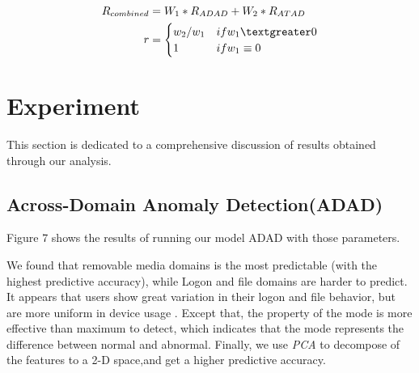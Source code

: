 \documentclass[conference]{IEEEtran}
\begin{document}
\begin{align}
R_{combined}&= W_1*R_{ADAD}+W_2*R_{ATAD}\\
r&=\begin{cases}
w_2/w_1
&\mbox{if } w_1 \textgreater 0\\
1
&\mbox{if } w_1 \equiv 0\\
\end{cases}
\end{align}


\section{Experiment}

This section is dedicated to a comprehensive discussion of results obtained through our analysis.

\subsection{Across-Domain Anomaly Detection(ADAD)}\label{AA}

Figure 7 shows the results of running our model ADAD with those parameters.

We found that removable media domains is the most predictable (with the highest predictive accuracy), while Logon and file domains are harder to predict. It appears that users show great variation in their logon and file behavior, but are more uniform in device usage . Except that, the property of the mode is more effective than maximum to detect, which indicates that the mode  represents the difference between normal and abnormal. Finally, we use \emph{PCA} to decompose of the features to a 2-D space,and get a higher predictive accuracy.
\end{document}
